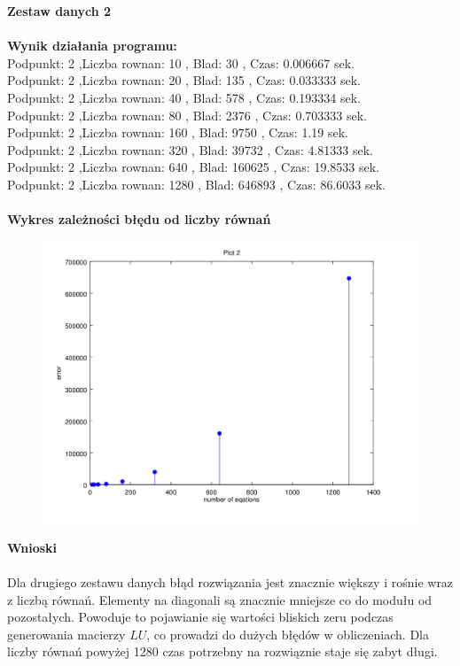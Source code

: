 \documentclass[a4paper, 11pt]{article}
\begin{document}
\vspace{1cm}
\textbf{Zestaw danych 2}\\
\\

\textbf{Wynik działania programu:} \\
Podpunkt: 2 ,Liczba rownan: 10 , Blad: 30 , Czas: 0.006667 sek. \\
Podpunkt: 2 ,Liczba rownan: 20 , Blad: 135 , Czas: 0.033333 sek. \\
Podpunkt: 2 ,Liczba rownan: 40 , Blad: 578 , Czas: 0.193334 sek. \\
Podpunkt: 2 ,Liczba rownan: 80 , Blad: 2376 , Czas: 0.703333 sek. \\
Podpunkt: 2 ,Liczba rownan: 160 , Blad: 9750 , Czas: 1.19 sek. \\
Podpunkt: 2 ,Liczba rownan: 320 , Blad: 39732 , Czas: 4.81333 sek. \\
Podpunkt: 2 ,Liczba rownan: 640 , Blad: 160625 , Czas: 19.8533 sek. \\
Podpunkt: 2 ,Liczba rownan: 1280 , Blad: 646893 , Czas: 86.6033 sek. \\
\\
\vspace{1cm}
\textbf{Wykres zależności błędu od liczby równań}\\
\begin{figure}[th]
\includegraphics[width=\textwidth]{wykres2}
\end{figure}


\textbf{Wnioski}\\
\\
Dla drugiego zestawu danych błąd rozwiązania jest znacznie większy i rośnie wraz z liczbą równań. 
Elementy na diagonali są znacznie mniejsze co do modułu od pozostałych. Powoduje to pojawianie się wartości bliskich zeru podczas generowania macierzy $LU$, co prowadzi do dużych błędów w obliczeniach. Dla liczby równań powyżej 1280 czas potrzebny na rozwiąznie staje się zabyt długi. 
\end{document}
